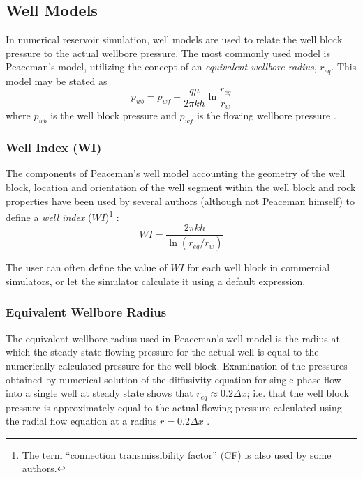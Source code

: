 \subsection{Well Models} %
\label{sub:well_models}
In numerical reservoir simulation, well models are used to relate the well block pressure to the actual wellbore pressure. The most commonly used model is Peaceman's model, utilizing the concept of an \emph{equivalent wellbore radius}, $r_{eq}$. This model may be stated as
\begin{equation}
    \label{eq:intro-well-model}
    p_{wb} = p_{wf} + \frac{q\mu}{2\pi k h} \ln \frac{r_{eq}}{r_{w}}
\end{equation}
where $p_{wb}$ is the well block pressure and $p_{wf}$ is the flowing wellbore pressure \cite{Peaceman1990Interpretation}.

\subsubsection{Well Index (WI)} %
\label{ssub:well_index_}
The components of Peaceman's well model accounting the geometry of the well block, location and orientation of the well segment within the well block and rock properties have been used by several authors (although not Peaceman himself) to define a \emph{well index} ($WI$)\footnote{The term ``connection transmissibility factor'' (CF) is also used by some authors\cite{Peaceman2003New,Schlumberger2013Eclipse}.} \cite{Wolfsteiner2003Calculation}:
\begin{equation}
    \label{eq:well-index-intro}
    WI = \frac{2\pi kh}{\ln \left(r_{eq}/r_{w}\right)}
\end{equation}

The user can often define the value of $WI$ for each well block in commercial simulators, or let the simulator calculate it using a default expression.

\subsubsection{Equivalent Wellbore Radius} %
\label{ssub:equivalent_wellbore_radius}
The equivalent wellbore radius used in Peaceman's well model is the radius at which the steady-state flowing pressure for the actual well is equal to the numerically calculated pressure for the well block. Examination of the pressures obtained by numerical solution of the diffusivity equation for single-phase flow into a single well at steady state shows that $r_{eq} \approx 0.2 \Delta x$; i.e. that the well block pressure is approximately equal to the actual flowing pressure calculated using the radial flow equation at a radius $r = 0.2 \Delta x$ \cite{Peaceman1978Interpretation}.

